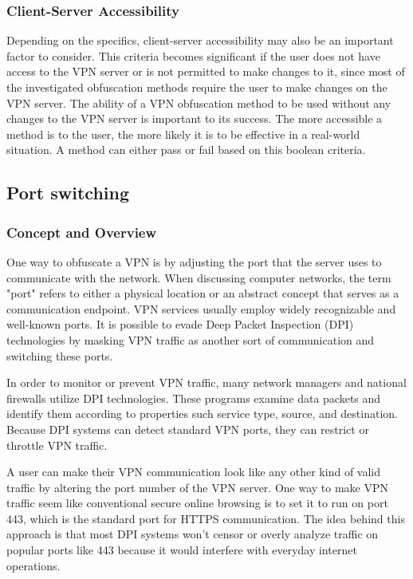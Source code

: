 \documentclass[12pt, fleqn, a4paper]{article}
\begin{document}
\subsubsection{Client-Server Accessibility}
Depending on the specifics, client-server accessibility may also be an important factor to consider. This criteria becomes significant if the user does not have access to the VPN server or is not permitted to make changes to it, since most of the investigated obfuscation methods require the user to make changes on the VPN server. 
The ability of a VPN obfuscation method to be used without any changes to the VPN server is important to its success. 
The more accessible a method is to the user, the more likely it is to be effective in a real-world situation.
A method can either pass or fail based on this boolean criteria.

\subsection{Port switching}
\subsubsection{Concept and Overview}
One way to obfuscate a VPN is by adjusting the port that the server uses to communicate with the network. When discussing computer networks, the term "port" refers to either a physical location or an abstract concept that serves as a communication endpoint. VPN services usually employ widely recognizable and well-known ports. It is possible to evade Deep Packet Inspection (DPI) technologies by masking VPN traffic as another sort of communication and switching these ports.

In order to monitor or prevent VPN traffic, many network managers and national firewalls utilize DPI technologies. These programs examine data packets and identify them according to properties such service type, source, and destination. Because DPI systems can detect standard VPN ports, they can restrict or throttle VPN traffic.

A user can make their VPN communication look like any other kind of valid traffic by altering the port number of the VPN server. One way to make VPN traffic seem like conventional secure online browsing is to set it to run on port 443, which is the standard port for HTTPS communication. The idea behind this approach is that most DPI systems won't censor or overly analyze traffic on popular ports like 443 because it would interfere with everyday internet operations.
\end{document}
